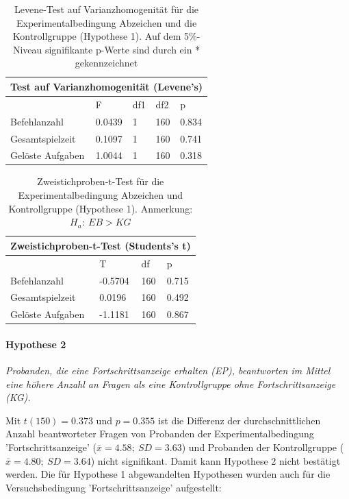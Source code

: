 \begin{table}[htbp]
\centering
\begin{tabular}{ |p{4cm}||p{2.0cm}|p{2.0cm}|p{2.0cm}|p{2.0cm}| }
 \hline
 \multicolumn{5}{|c|}{Test auf Varianzhomogenität (Levene's)} \\
 \hline
 & F & df1 &df2 &p \\
 \hline
  Befehlanzahl      & 0.0439    & 1 &   160 & 0.834\\
  Gesamtspielzeit   & 0.1097    & 1 &   160 & 0.741\\
  Gelöste Aufgaben  & 1.0044    & 1 &   160 & 0.318\\
 \hline
\end{tabular}
\caption{Levene-Test auf Varianzhomogenität für die Experimentalbedingung Abzeichen und die Kontrollgruppe (Hypothese 1). Auf dem 5\%-Niveau signifikante p-Werte sind durch ein * gekennzeichnet}
\label{levene_hypo_1}
\end{table}
\begin{table}[htbp]
\centering
\begin{tabular}{ |p{4cm}||p{2.0cm}|p{2.0cm}|p{2.0cm}| }
 \hline
 \multicolumn{4}{|c|}{Zweistichproben-t-Test (Students's t)} \\
 \hline
 & T &df & p \\
 \hline
  Befehlanzahl       & -0.5704  &   160 & 0.715\\
  Gesamtspielzeit    &  0.0196  &   160 & 0.492\\
  Gelöste Aufgaben   & -1.1181  &   160 & 0.867\\
 \hline
\end{tabular}
\caption{Zweistichproben-t-Test für die Experimentalbedingung Abzeichen und Kontrollgruppe (Hypothese 1). Anmerkung: $H_a:\: EB > KG$}
\label{ttest_hypo_1}
\end{table}



\paragraph{Hypothese 2 }
\begin{center}
    \textit{Probanden, die eine Fortschrittsanzeige erhalten (EP), beantworten im Mittel eine höhere Anzahl an Fragen als eine Kontrollgruppe ohne Fortschrittsanzeige (KG).} 
\end{center}
Mit $t(150)=0.373$ und $p=0.355$ ist die Differenz der durchschnittlichen Anzahl beantworteter Fragen von Probanden der Experimentalbedingung 'Fortschrittsanzeige' ($\bar{x}  =4.58;\:SD=3.63$) und Probanden der Kontrollgruppe ($\bar{x} =4.80;\:SD=3.64$) nicht signifikant. Damit kann Hypothese 2 nicht bestätigt werden. Die für Hypothese 1 abgewandelten Hypothesen wurden auch für die Versuchsbedingung 'Fortschrittsanzeige' aufgestellt: 

